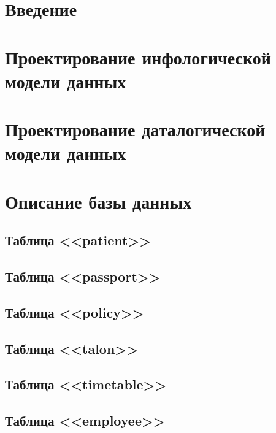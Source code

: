 






\newpage
{}
\tableofcontents

\newpage
{}
\section*{Введение}


\section{Проектирование инфологической модели данных}


\section{Проектирование даталогической модели данных}


\section{Описание базы данных}
\setcounter{figure}{0}

\subsection{Таблица <<patient>>}

\subsection{Таблица <<passport>>}

\subsection{Таблица <<policy>>}

\subsection{Таблица <<talon>>}

\subsection{Таблица <<timetable>>}

\subsection{Таблица <<employee>>}



